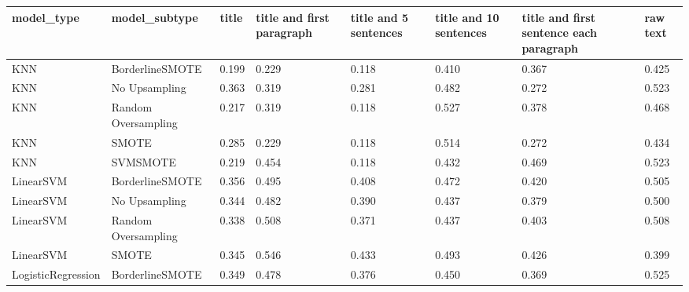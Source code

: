 \begin{tabular}{llllllll}
\toprule
                  model\_type &       model\_subtype & title & title and first paragraph & title and 5 sentences & title and 10 sentences & title and first sentence each paragraph & raw text \\
\midrule
                         KNN &     BorderlineSMOTE & 0.199 &                     0.229 &                 0.118 &                  0.410 &                                   0.367 &    0.425 \\
                         KNN &       No Upsampling & 0.363 &                     0.319 &                 0.281 &                  0.482 &                                   0.272 &    0.523 \\
                         KNN & Random Oversampling & 0.217 &                     0.319 &                 0.118 &                  0.527 &                                   0.378 &    0.468 \\
                         KNN &               SMOTE & 0.285 &                     0.229 &                 0.118 &                  0.514 &                                   0.272 &    0.434 \\
                         KNN &            SVMSMOTE & 0.219 &                     0.454 &                 0.118 &                  0.432 &                                   0.469 &    0.523 \\
                   LinearSVM &     BorderlineSMOTE & 0.356 &                     0.495 &                 0.408 &                  0.472 &                                   0.420 &    0.505 \\
                   LinearSVM &       No Upsampling & 0.344 &                     0.482 &                 0.390 &                  0.437 &                                   0.379 &    0.500 \\
                   LinearSVM & Random Oversampling & 0.338 &                     0.508 &                 0.371 &                  0.437 &                                   0.403 &    0.508 \\
                   LinearSVM &               SMOTE & 0.345 &                     0.546 &                 0.433 &                  0.493 &                                   0.426 &    0.399 \\
          LogisticRegression &     BorderlineSMOTE & 0.349 &                     0.478 &                 0.376 &                  0.450 &                                   0.369 &    0.525 \\

\end{tabular}
